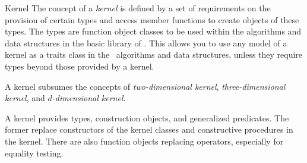 \begin{ccRefConcept}{Kernel}
The concept of a {\em kernel} is defined by a set of requirements on
the provision of certain types and access member functions to create 
objects of these types. The types are function object classes to be used
within the algorithms and data structures in the basic library of \cgal. 
This allows you to use any model of a kernel as a traits class in 
the \cgal\ algorithms and data structures, unless they require types 
beyond those provided by a kernel. 

A kernel subsumes the concepts of {\em two-dimensional kernel},
{\em three-dimensional kernel}, and {\em $d$-dimensional kernel}.

A kernel provides types, construction objects, and generalized predicates. 
The former replace constructors of the kernel classes and constructive procedures
in the kernel. There are also function objects replacing operators, especially
for equality testing.


\ccTypes

\ccGlue
{}



\ccGlue
{}
\ccGlue
{}
\ccGlue
{}
\ccGlue
{}
\ccGlue
{}
\ccGlue
{}
\ccGlue
{}
\ccGlue
{}
\ccGlue
{}
\ccGlue
{}



\end{ccRefConcept}
